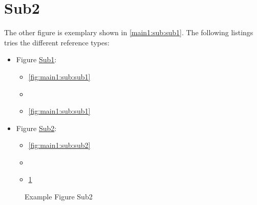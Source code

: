 \section[Sub2]{Sub2}\label{main1:sub:sub2}

The other figure is exemplary shown in \autoref{main1:sub:sub1}. The following listings tries the different reference types:
\begin{itemize}
    \item Figure \hyperref[fig:main1:sub:sub1]{Sub1}:
        \begin{itemize}
            \item \autoref{fig:main1:sub:sub1}
            \item {}
            \item \ref{fig:main1:sub:sub1}
        \end{itemize}
    \item Figure \hyperref[fig:main1:sub:sub2]{Sub2}:
        \begin{itemize}
            \item \autoref{fig:main1:sub:sub2}
            \item {}
            \item \ref{fig:main1:sub:sub2}
        \end{itemize}
\end{itemize}


\begin{figure}[!h]
    \caption[{Main1; Sub; Sub2}]{Example Figure Sub2}
    \label{fig:main1:sub:sub2}
\end{figure}

